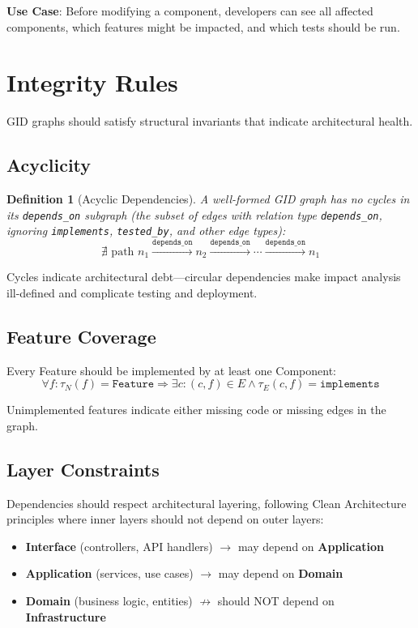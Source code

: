 \documentclass[11pt,a4paper]{article}
\newtheorem{definition}{Definition}
\begin{document}
\textbf{Use Case}: Before modifying a component, developers can see all affected components, which features might be impacted, and which tests should be run.

\section{Integrity Rules}

GID graphs should satisfy structural invariants that indicate architectural health.

\subsection{Acyclicity}

\begin{definition}[Acyclic Dependencies]
A well-formed GID graph has no cycles in its \texttt{depends\_on} subgraph (the subset of edges with relation type \texttt{depends\_on}, ignoring \texttt{implements}, \texttt{tested\_by}, and other edge types):
\[
\nexists \text{ path } n_1 \xrightarrow{\texttt{depends\_on}} n_2 \xrightarrow{\texttt{depends\_on}} \cdots \xrightarrow{\texttt{depends\_on}} n_1
\]
\end{definition}

Cycles indicate architectural debt---circular dependencies make impact analysis ill-defined and complicate testing and deployment.

\subsection{Feature Coverage}

Every Feature should be implemented by at least one Component:
\[
\forall f : \tau_N(f) = \texttt{Feature} \Rightarrow \exists c : (c, f) \in E \land \tau_E(c, f) = \texttt{implements}
\]

Unimplemented features indicate either missing code or missing edges in the graph.

\subsection{Layer Constraints}

Dependencies should respect architectural layering, following Clean Architecture principles where inner layers should not depend on outer layers:

\begin{itemize}[noitemsep]
    \item \textbf{Interface} (controllers, API handlers) $\rightarrow$ may depend on \textbf{Application}
    \item \textbf{Application} (services, use cases) $\rightarrow$ may depend on \textbf{Domain}
    \item \textbf{Domain} (business logic, entities) $\not\rightarrow$ should NOT depend on \textbf{Infrastructure}
\end{itemize}
\end{document}
